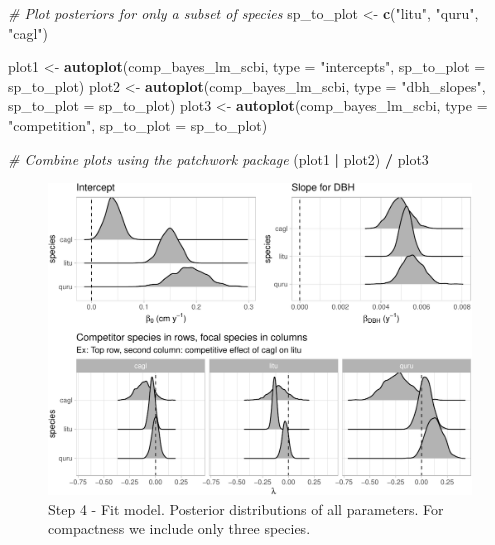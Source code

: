 \documentclass[12pt]{article}
\newenvironment{Shaded}{\begin{snugshade}}{\end{snugshade}}
\newcommand{\CommentTok}[1]{\textcolor[rgb]{0.56,0.35,0.01}{\textit{#1}}}
\newcommand{\DataTypeTok}[1]{\textcolor[rgb]{0.13,0.29,0.53}{#1}}
\newcommand{\KeywordTok}[1]{\textcolor[rgb]{0.13,0.29,0.53}{\textbf{#1}}}
\newcommand{\NormalTok}[1]{#1}
\newcommand{\OperatorTok}[1]{\textcolor[rgb]{0.81,0.36,0.00}{\textbf{#1}}}
\newcommand{\StringTok}[1]{\textcolor[rgb]{0.31,0.60,0.02}{#1}}
\begin{document}
\begin{Shaded}
\begin{Highlighting}[]
\CommentTok{# Plot posteriors for only a subset of species}
\NormalTok{sp_to_plot <-}\StringTok{ }\KeywordTok{c}\NormalTok{(}\StringTok{"litu"}\NormalTok{, }\StringTok{"quru"}\NormalTok{, }\StringTok{"cagl"}\NormalTok{)}

\NormalTok{plot1 <-}\StringTok{ }\KeywordTok{autoplot}\NormalTok{(comp_bayes_lm_scbi, }\DataTypeTok{type =} \StringTok{"intercepts"}\NormalTok{, }
                  \DataTypeTok{sp_to_plot =}\NormalTok{ sp_to_plot)}
\NormalTok{plot2 <-}\StringTok{ }\KeywordTok{autoplot}\NormalTok{(comp_bayes_lm_scbi, }\DataTypeTok{type =} \StringTok{"dbh_slopes"}\NormalTok{, }
                  \DataTypeTok{sp_to_plot =}\NormalTok{ sp_to_plot)}
\NormalTok{plot3 <-}\StringTok{ }\KeywordTok{autoplot}\NormalTok{(comp_bayes_lm_scbi, }\DataTypeTok{type =} \StringTok{"competition"}\NormalTok{, }
                  \DataTypeTok{sp_to_plot =}\NormalTok{ sp_to_plot)}

\CommentTok{# Combine plots using the patchwork package}
\NormalTok{(plot1 }\OperatorTok{|}\StringTok{ }\NormalTok{plot2) }\OperatorTok{/}\StringTok{ }\NormalTok{plot3}
\end{Highlighting}
\end{Shaded}

\begin{figure}

{\centering \includegraphics[width=1\linewidth]{Figures/scbi-posterior-viz-1} 

}

\caption{Step 4 - Fit model. Posterior distributions of all parameters. For compactness we include only three species.}\label{fig:scbi-posterior-viz}
\end{figure}
\end{document}

